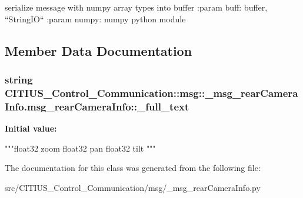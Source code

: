 \begin{DoxyVerb}
serialize message with numpy array types into buffer
:param buff: buffer, ``StringIO``
:param numpy: numpy python module
\end{DoxyVerb}
 

\subsection{\-Member \-Data \-Documentation}
\hypertarget{class_c_i_t_i_u_s___control___communication_1_1msg_1_1__msg__rear_camera_info_1_1msg__rear_camera_info_a3be0186e92fb38ba24577214ff77ed28}{
\subsubsection[{\-\_\-full\-\_\-text}]{\setlength{\rightskip}{0pt plus 5cm}string \-C\-I\-T\-I\-U\-S\-\_\-\-Control\-\_\-\-Communication\-::msg\-::\-\_\-msg\-\_\-rear\-Camera\-Info.\-msg\-\_\-rear\-Camera\-Info\-::\-\_\-full\-\_\-text}}\label{class_c_i_t_i_u_s___control___communication_1_1msg_1_1__msg__rear_camera_info_1_1msg__rear_camera_info_a3be0186e92fb38ba24577214ff77ed28}
{\bfseries \-Initial value\-:}
\begin{DoxyCode}
"""float32 zoom
float32 pan
float32 tilt
"""
\end{DoxyCode}


\-The documentation for this class was generated from the following file\-:\begin{DoxyCompactItemize}
\item 
src/\-C\-I\-T\-I\-U\-S\-\_\-\-Control\-\_\-\-Communication/msg/\-\_\-msg\-\_\-rear\-Camera\-Info.\-py\end{DoxyCompactItemize}
